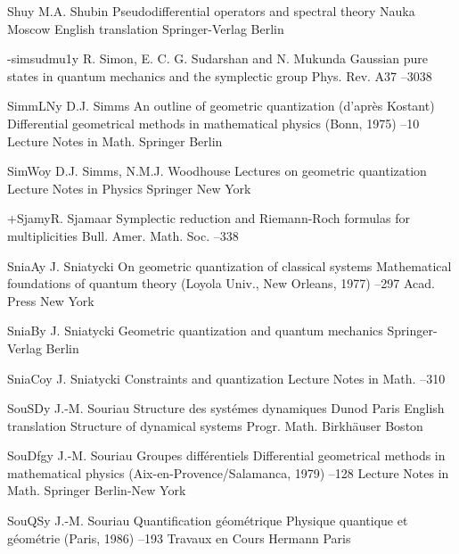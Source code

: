 \documentclass[11pt]{amsart}
\numberwithin{equation}{section}
\theoremstyle{remark}
\newcommand{\by}{\mathbf y}
\begin{document}
\begin{thebibliography}{199}
 Shu\by{ M.A. Shubin \book Pseudodifferential operators and spectral
theory \publ Nauka \publaddr Moscow  \transl English translation
\publ Springer-Verlag \publaddr Berlin }

 -simsudmu1\by{ R. Simon, E. C. G. Sudarshan and N. Mukunda \paper
Gaussian pure states in quantum mechanics and the symplectic group
\jour Phys. Rev.  \vol A37  --3038}

 SimmLN\by{ D.J. Simms \paper An outline of geometric quantization
(d'apr\`es Kostant) \inbook Differential geometrical methods in mathematical
physics (Bonn, 1975) --10 \bookinfo Lecture Notes in Math. 
\publ Springer \publaddr Berlin }

 SimWo\by{ D.J. Simms, N.M.J. Woodhouse \book Lectures on geometric
quantization \bookinfo Lecture Notes in Physics  \publ Springer
\publaddr New York }

 +Sjam\by{R. Sjamaar \paper Symplectic reduction and Riemann-Roch formulas
for multiplicities \jour Bull. Amer. Math. Soc.   --338}

 SniaA\by{ J. Sniatycki \paper On geometric quantization of classical
systems \inbook Mathematical foundations of quantum theory (Loyola Univ., New
Orleans, 1977) --297 \publ Acad. Press \publaddr New York }

 SniaB\by{ J. Sniatycki \book Geometric quantization and quantum mechanics
\publ Springer-Verlag \publaddr Berlin }

 SniaCo\by{ J. Sniatycki \paper Constraints and quantization \inbook
Lecture Notes in Math.  --310 }

 SouSD\by{ J.-M. Souriau \book Structure des syst\'emes dynamiques \publ
Dunod \publaddr Paris  \transl English translation \book Structure of
dynamical systems \bookinfo Progr. Math.  \publ Birkh\"auser \publaddr
Boston }

 SouDfg\by{ J.-M. Souriau \paper Groupes diff\'erentiels \inbook
Differential geometrical methods in mathematical physics
(Aix-en-Provence/Salamanca, 1979) --128 \bookinfo Lecture Notes in
Math.  \publ Springer \publaddr Berlin-New York }

 SouQS\by{ J.-M. Souriau \paper Quantification g\'eom\'etrique \inbook
Physique quantique et g\'eom\'etrie (Paris, 1986) --193 \bookinfo
Travaux en Cours  \publ Hermann \publaddr Paris }


\end{thebibliography}
\end{document}
